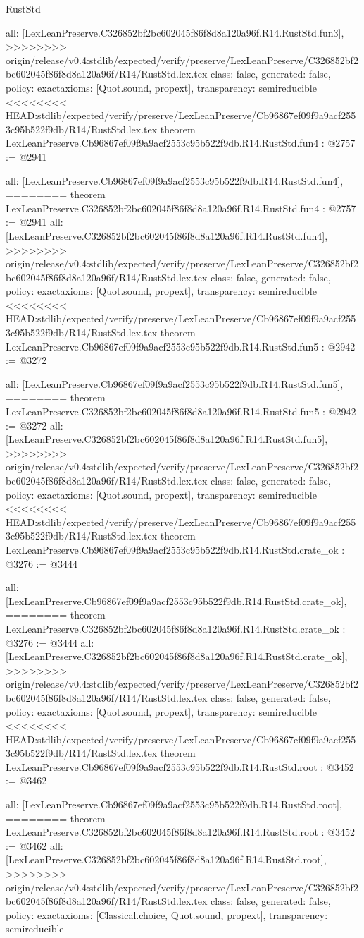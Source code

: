 \begin{lexlean}{RustStd}
\begin{coremodule}
{\begin{coremodule}
{{{{{{{  all: [LexLeanPreserve.C326852bf2bc602045f86f8d8a120a96f.R14.RustStd.fun3],
>>>>>>>> origin/release/v0.4:stdlib/expected/verify/preserve/LexLeanPreserve/C326852bf2bc602045f86f8d8a120a96f/R14/RustStd.lex.tex
  class: false,
  generated: false,
  policy: exact{axioms: [Quot.sound, propext]},
  transparency: semireducible
}
<<<<<<<< HEAD:stdlib/expected/verify/preserve/LexLeanPreserve/Cb96867ef09f9a9acf2553c95b522f9db/R14/RustStd.lex.tex
theorem LexLeanPreserve.Cb96867ef09f9a9acf2553c95b522f9db.R14.RustStd.fun4 : @2757 := @2941 {
  all: [LexLeanPreserve.Cb96867ef09f9a9acf2553c95b522f9db.R14.RustStd.fun4],
========
theorem LexLeanPreserve.C326852bf2bc602045f86f8d8a120a96f.R14.RustStd.fun4 : @2757 := @2941 {
  all: [LexLeanPreserve.C326852bf2bc602045f86f8d8a120a96f.R14.RustStd.fun4],
>>>>>>>> origin/release/v0.4:stdlib/expected/verify/preserve/LexLeanPreserve/C326852bf2bc602045f86f8d8a120a96f/R14/RustStd.lex.tex
  class: false,
  generated: false,
  policy: exact{axioms: [Quot.sound, propext]},
  transparency: semireducible
}
<<<<<<<< HEAD:stdlib/expected/verify/preserve/LexLeanPreserve/Cb96867ef09f9a9acf2553c95b522f9db/R14/RustStd.lex.tex
theorem LexLeanPreserve.Cb96867ef09f9a9acf2553c95b522f9db.R14.RustStd.fun5 : @2942 := @3272 {
  all: [LexLeanPreserve.Cb96867ef09f9a9acf2553c95b522f9db.R14.RustStd.fun5],
========
theorem LexLeanPreserve.C326852bf2bc602045f86f8d8a120a96f.R14.RustStd.fun5 : @2942 := @3272 {
  all: [LexLeanPreserve.C326852bf2bc602045f86f8d8a120a96f.R14.RustStd.fun5],
>>>>>>>> origin/release/v0.4:stdlib/expected/verify/preserve/LexLeanPreserve/C326852bf2bc602045f86f8d8a120a96f/R14/RustStd.lex.tex
  class: false,
  generated: false,
  policy: exact{axioms: [Quot.sound, propext]},
  transparency: semireducible
}
<<<<<<<< HEAD:stdlib/expected/verify/preserve/LexLeanPreserve/Cb96867ef09f9a9acf2553c95b522f9db/R14/RustStd.lex.tex
theorem LexLeanPreserve.Cb96867ef09f9a9acf2553c95b522f9db.R14.RustStd.crate_ok : @3276 := @3444 {
  all: [LexLeanPreserve.Cb96867ef09f9a9acf2553c95b522f9db.R14.RustStd.crate_ok],
========
theorem LexLeanPreserve.C326852bf2bc602045f86f8d8a120a96f.R14.RustStd.crate_ok : @3276 := @3444 {
  all: [LexLeanPreserve.C326852bf2bc602045f86f8d8a120a96f.R14.RustStd.crate_ok],
>>>>>>>> origin/release/v0.4:stdlib/expected/verify/preserve/LexLeanPreserve/C326852bf2bc602045f86f8d8a120a96f/R14/RustStd.lex.tex
  class: false,
  generated: false,
  policy: exact{axioms: [Quot.sound, propext]},
  transparency: semireducible
}
<<<<<<<< HEAD:stdlib/expected/verify/preserve/LexLeanPreserve/Cb96867ef09f9a9acf2553c95b522f9db/R14/RustStd.lex.tex
theorem LexLeanPreserve.Cb96867ef09f9a9acf2553c95b522f9db.R14.RustStd.root : @3452 := @3462 {
  all: [LexLeanPreserve.Cb96867ef09f9a9acf2553c95b522f9db.R14.RustStd.root],
========
theorem LexLeanPreserve.C326852bf2bc602045f86f8d8a120a96f.R14.RustStd.root : @3452 := @3462 {
  all: [LexLeanPreserve.C326852bf2bc602045f86f8d8a120a96f.R14.RustStd.root],
>>>>>>>> origin/release/v0.4:stdlib/expected/verify/preserve/LexLeanPreserve/C326852bf2bc602045f86f8d8a120a96f/R14/RustStd.lex.tex
  class: false,
  generated: false,
  policy: exact{axioms: [Classical.choice, Quot.sound, propext]},
  transparency: semireducible
}

}}}}}}}}}}
\end{coremodule}}
\end{coremodule}
\end{lexlean}
